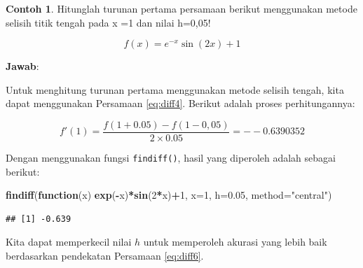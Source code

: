 \documentclass[
]{book}
\newenvironment{Shaded}{\begin{snugshade}}{\end{snugshade}}
\newcommand{\AttributeTok}[1]{\textcolor[rgb]{0.13,0.29,0.53}{#1}}
\newcommand{\ControlFlowTok}[1]{\textcolor[rgb]{0.13,0.29,0.53}{\textbf{#1}}}
\newcommand{\DecValTok}[1]{\textcolor[rgb]{0.00,0.00,0.81}{#1}}
\newcommand{\FloatTok}[1]{\textcolor[rgb]{0.00,0.00,0.81}{#1}}
\newcommand{\FunctionTok}[1]{\textcolor[rgb]{0.13,0.29,0.53}{\textbf{#1}}}
\newcommand{\NormalTok}[1]{#1}
\newcommand{\SpecialCharTok}[1]{\textcolor[rgb]{0.81,0.36,0.00}{\textbf{#1}}}
\newcommand{\StringTok}[1]{\textcolor[rgb]{0.31,0.60,0.02}{#1}}
\theoremstyle{definition}
\theoremstyle{definition}
\newtheorem{example}{Contoh}[chapter]
\theoremstyle{definition}
\theoremstyle{definition}
\theoremstyle{remark}
\begin{document}
\begin{example}
\protect\hypertarget{exm:diffexm}{}\label{exm:diffexm}Hitunglah turunan pertama persamaan berikut menggunakan metode selisih titik tengah pada x =1 dan nilai h=0,05!
\end{example}

\[
f\left(x\right)=e^{-x}\sin\left(2x\right)+1
\]

\textbf{Jawab}:

Untuk menghitung turunan pertama menggunakan metode selisih tengah, kita dapat menggunakan Persamaan \eqref{eq:diff4}. Berikut adalah proses perhitungannya:

\[
f'\left(1\right) = \frac{f\left(1+0.05\right)-f\left(1-0,05\right)}{2\times0.05}=--0.6390352
\]

Dengan menggunakan fungsi \texttt{findiff()}, hasil yang diperoleh adalah sebagai berikut:

\begin{Shaded}
\begin{Highlighting}[]
\FunctionTok{findiff}\NormalTok{(}\ControlFlowTok{function}\NormalTok{(x)}
  \FunctionTok{exp}\NormalTok{(}\SpecialCharTok{{-}}\NormalTok{x)}\SpecialCharTok{*}\FunctionTok{sin}\NormalTok{(}\DecValTok{2}\SpecialCharTok{*}\NormalTok{x)}\SpecialCharTok{+}\DecValTok{1}\NormalTok{, }\AttributeTok{x=}\DecValTok{1}\NormalTok{, }\AttributeTok{h=}\FloatTok{0.05}\NormalTok{,}
  \AttributeTok{method=}\StringTok{"central"}\NormalTok{)}
\end{Highlighting}
\end{Shaded}

\begin{verbatim}
## [1] -0.639
\end{verbatim}

Kita dapat memperkecil nilai \(h\) untuk memperoleh akurasi yang lebih baik berdasarkan pendekatan Persamaan \eqref{eq:diff6}.

\begin{Shaded}
\end{Shaded}
\end{document}
